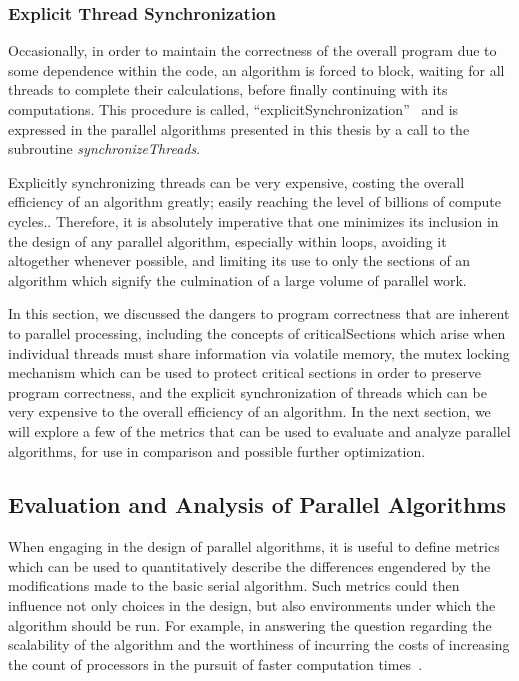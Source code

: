 %
%
\subsubsection{Explicit Thread Synchronization}
\label{ch2sPPssPCsssETS}
Occasionally, in order to maintain the correctness of the overall program due to some dependence within the code, an algorithm is forced to block, waiting for all threads to complete their calculations, before finally continuing with its computations. This procedure is called, ``\gls{explicitSynchronization}''~\cite[p.~34]{CUDA18} and is expressed in the parallel algorithms presented in this thesis by a call to the subroutine \textit{synchronizeThreads}.

Explicitly synchronizing threads can be very expensive, costing the overall efficiency of an algorithm greatly; easily reaching the level of billions of compute cycles.. Therefore, it is absolutely imperative that one minimizes its inclusion in the design of any parallel algorithm, especially within loops, avoiding it altogether whenever possible, and limiting its use to only the sections of an algorithm which signify the culmination of a large volume of parallel work.

In this section, we discussed the dangers to program correctness that are inherent to parallel processing, including the concepts of \glspl{criticalSection} which arise when individual threads must share information via volatile memory, the mutex locking mechanism which can be used to protect critical sections in order to preserve program correctness, and the explicit synchronization of threads which can be very expensive to the overall efficiency of an algorithm. In the next section, we will explore a few of the metrics that can be used to evaluate and analyze parallel algorithms, for use in comparison and possible further optimization. 

%
%
%
%
\subsection{Evaluation and Analysis of Parallel Algorithms}
\label{ch2sPPssEAPA}
When engaging in the design of parallel algorithms, it is useful to define metrics which can be used to quantitatively describe the differences engendered by the modifications made to the basic serial algorithm. Such metrics could then influence not only choices in the design, but also environments under which the algorithm should be run. For example, in answering the question regarding the scalability of the algorithm and the worthiness of incurring the costs of increasing the count of processors in the pursuit of faster computation times~\cite[p.~330]{Lang17}.

